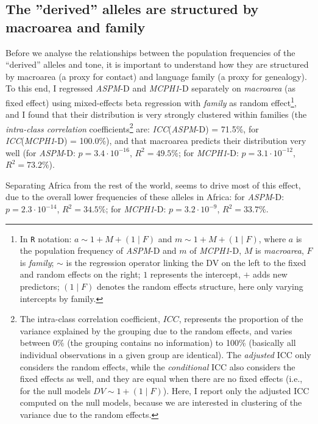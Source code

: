 \documentclass[twoside,onecolumn]{article}
\begin{document}
\subsection{The ''derived'' alleles are structured by macroarea and family}

Before we analyse the relationships between the population frequencies of the ``derived'' alleles and tone, it is important to understand how they are structured by macroarea (a proxy for contact) and language family (a proxy for genealogy).
To this end, I regressed \textit{ASPM}-D and \textit{MCPH1}-D separately on \textit{macroarea} (as fixed effect) using mixed-effects beta regression with \textit{family} as random effect\footnote{\label{note_reg_R}In \texttt{R} notation: $a \sim 1 + M + (1 \mid F)$ and $m \sim 1 + M + (1 \mid F)$, where $a$ is the population frequency of \textit{ASPM}-D and $m$ of \textit{MCPH1}-D, $M$ is \textit{macroarea}, $F$ is \textit{family}; $\sim$ is the regression operator linking the DV on the left to the fixed and random effects on the right; $1$ represents the intercept, $+$ adds new predictors; $(1 \mid F)$ denotes the random effects structure, here only varying intercepts by family.},
and I found that their distribution is very strongly clustered within families (the \emph{intra-class correlation} coefficients\footnote{The intra-class correlation coefficient, $ICC$, represents the proportion of the variance explained by the grouping due to the random effects, and varies between 0\% (the grouping contains no information) to 100\% (basically all individual observations in a given group are identical). The \emph{adjusted} ICC only considers the random effects, while the \emph{conditional} ICC also considers the fixed effects as well, and they are equal when there are no fixed effects (i.e., for the null models $DV \sim 1 + (1 \mid F)$). Here, I report only the adjusted ICC computed on the null models, because we are interested in clustering of the variance due to the random effects.} are: \textit{ICC}(\textit{ASPM}-D) = 71.5\%, for \textit{ICC}(\textit{MCPH1}-D) = 100.0\%),
and that macroarea predicts their distribution very well (for \textit{ASPM}-D: $p = 3.4\cdot10^{-16}$, $R^2 = 49.5\%$; for \textit{MCPH1}-D: $p = 3.1\cdot10^{-12}$, $R^2 = 73.2\%$).

Separating Africa from the rest of the world, seems to drive most of this effect, due to the overall lower frequencies of these alleles in Africa: for \textit{ASPM}-D: $p = 2.3\cdot10^{-14}$, $R^2 = 34.5\%$; for \textit{MCPH1}-D: $p = 3.2\cdot10^{-9}$, $R^2 = 33.7\%$.
\end{document}
